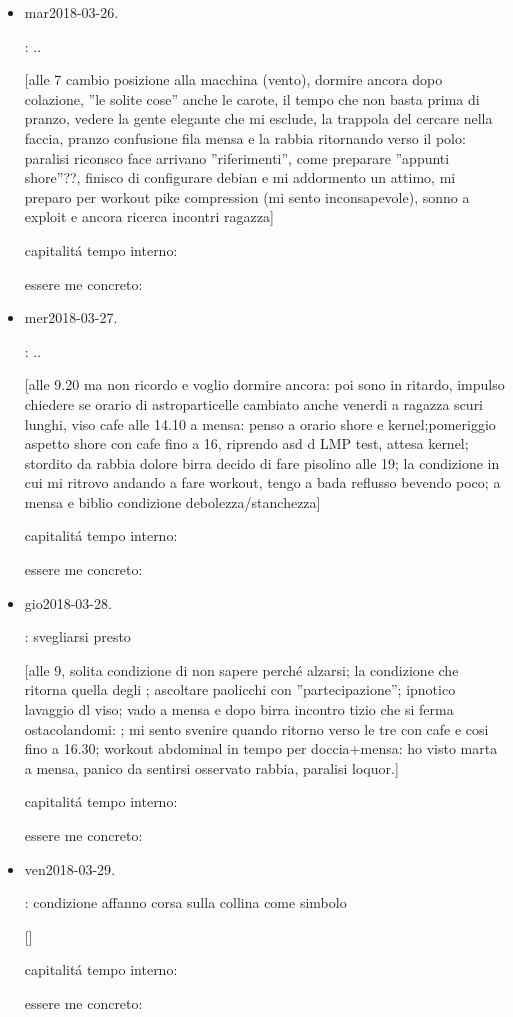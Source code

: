 \begin{itemize}
capitalit\'a tempo interno: 

essere me concreto: 

\item{mar}{2018-03-26}.

: ..

[alle 7 cambio posizione alla macchina (vento), dormire ancora dopo colazione, ''le solite cose'' anche le carote, il tempo che non basta prima di pranzo, vedere la gente elegante che mi esclude, la trappola del cercare nella faccia, pranzo confusione fila mensa e la rabbia ritornando verso il polo: paralisi riconsco face arrivano ''riferimenti'', come preparare ''appunti shore''??, finisco di configurare debian e mi addormento un attimo, mi preparo per workout pike compression (mi sento inconsapevole), sonno a exploit e ancora ricerca incontri ragazza]

capitalit\'a tempo interno: 

essere me concreto: 

\item{mer}{2018-03-27}.

: ..

[alle 9.20 ma non ricordo e voglio dormire ancora: poi sono in ritardo, impulso chiedere se orario di astroparticelle cambiato anche venerdi a ragazza scuri lunghi, viso cafe alle 14.10 a mensa: penso a orario shore e kernel;pomeriggio aspetto shore con cafe fino a 16, riprendo asd d LMP test, attesa kernel; stordito da rabbia dolore birra decido di fare pisolino alle 19; la condizione in cui mi ritrovo andando a fare workout, tengo a bada reflusso bevendo poco; a mensa e biblio condizione debolezza/stanchezza]

capitalit\'a tempo interno:

essere me concreto: 

\item{gio}{2018-03-28}.

: svegliarsi presto

[alle 9, solita condizione di non sapere perch\'e alzarsi; la condizione che ritorna quella degli ; ascoltare paolicchi con ''partecipazione''; ipnotico lavaggio dl viso; vado a mensa e dopo birra incontro tizio che si ferma ostacolandomi: ; mi sento svenire quando ritorno verso le tre con cafe e cosi fino a 16.30; workout abdominal in tempo per doccia+mensa: ho visto marta a mensa, panico da sentirsi osservato rabbia, paralisi loquor.]

capitalit\'a tempo interno:

essere me concreto: 

\item{ven}{2018-03-29}.

: condizione affanno corsa sulla collina come simbolo

[]

capitalit\'a tempo interno:

essere me concreto: 

\end{itemize}